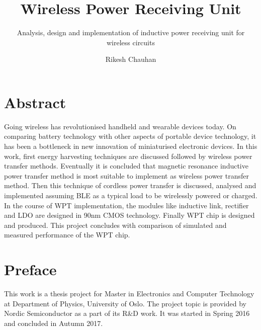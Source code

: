 \documentclass[12pt,a4paper,UKenglish]{report}
\title{Wireless Power Receiving Unit}
\subtitle{Analysis, design and implementation of inductive power receiving unit for wireless circuits}
\author{Rikesh Chauhan}
\makeatletter
\newcommand\frontmatter{%
    \cleardoublepage
  \pagenumbering{roman}}
\makeatother
\begin{document}



\duoforside[program={Electronics and Computer Technology},
  dept={Department of Physics},
  option={Microelectronics},
  image={DUO_UiO_segl.png},
  long]

\frontmatter{}


\chapter*{Abstract}
Going wireless has revolutionised handheld and wearable devices today. On comparing battery technology with other aspects of portable device technology, it has 
been a bottleneck in new innovation of miniaturised electronic devices.  In this work, first energy harvesting techniques are discussed followed by wireless power 
transfer methods. Eventually it is concluded that magnetic resonance inductive power transfer method is most suitable to implement as wireless power transfer 
method. Then this technique of cordless  power transfer is discussed, analysed and implemented assuming BLE as a typical load to be wirelessly powered or 
charged.  In the course of WPT implementation, the modules like inductive link, rectifier and LDO are designed in 90nm CMOS technology. Finally WPT chip 
is designed and produced. This project concludes with comparison of simulated and measured performance of the WPT chip.

\chapter*{Preface}
This work is a thesis project for Master in Electronics and Computer Technology at Department of Physics, University of Oslo. The project topic is provided by Nordic Semiconductor 
as a part of its R\&D work. It was started in Spring 2016 and concluded in Autumn 2017. \\
\end{document}
